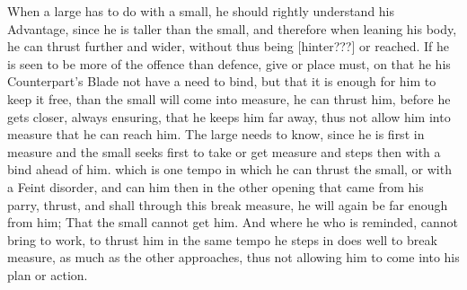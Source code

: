 When a large has to do with a small, he should rightly understand his
Advantage, since he is taller than the small, and therefore when
leaning his body, he can thrust further and wider, without thus being
[hinter???] or reached.
If he is seen to be more of the offence than defence, give or place
must, on that he his Counterpart's Blade not have a need to bind, but
that it is enough for him to keep it free, 
than the small will come into measure, he can thrust him, before he
gets closer, always ensuring, that he keeps him far away, thus not
allow him into measure that he can reach him. The large needs to know,
since he is first in measure and the small seeks first to take or get
measure and steps then with a bind ahead of him.
which is one tempo in which he can thrust the small, or with a Feint
disorder, and can him then in the other opening that came from his parry,
thrust, and shall through this break measure, he will again be far
enough from him;
That the small cannot get him. And where he who is reminded, cannot
bring to work, to thrust him in the same tempo he steps in does well
to break measure, as much as the other approaches, thus not allowing
him to come into his plan or action.

